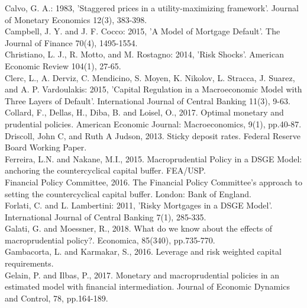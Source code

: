 \documentclass[12pt]{article}
\numberwithin{equation}{section}
\begin{document}
Calvo, G. A.: 1983, 'Staggered prices in a utility-maximizing framework'. Journal of Monetary Economics 12(3), 383-398.\\

Campbell, J. Y. and J. F. Cocco: 2015, 'A Model of Mortgage Default'. The Journal of Finance 70(4), 1495-1554.\\

Christiano, L. J., R. Motto, and M. Rostagno: 2014, 'Risk Shocks'. American Economic Review 104(1), 27-65.\\

Clerc, L., A. Derviz, C. Mendicino, S. Moyen, K. Nikolov, L. Stracca, J. Suarez, and A. P. Vardoulakis: 2015, 'Capital Regulation in a Macroeconomic Model with Three Layers of Default'. International Journal of Central Banking 11(3), 9-63.\\

Collard, F., Dellas, H., Diba, B. and Loisel, O., 2017. Optimal monetary and prudential policies. American Economic Journal: Macroeconomics, 9(1), pp.40-87. \\

Driscoll, John C, and Ruth A Judson, 2013. Sticky deposit rates. Federal Reserve Board
Working Paper.\\

Ferreira, L.N. and Nakane, M.I., 2015. Macroprudential Policy in a DSGE Model: anchoring the countercyclical capital buffer. FEA/USP. \\

Financial Policy Committee, 2016. The Financial Policy Committee’s approach to setting the countercyclical capital buffer. London: Bank of England. \\

Forlati, C. and L. Lambertini: 2011, 'Risky Mortgages in a DSGE Model'. International Journal of Central Banking 7(1), 285-335.\\

Galati, G. and Moessner, R., 2018. What do we know about the effects of macroprudential policy?. Economica, 85(340), pp.735-770.\\

Gambacorta, L. and Karmakar, S., 2016. Leverage and risk weighted capital requirements.\\

Gelain, P. and Ilbas, P., 2017. Monetary and macroprudential policies in an estimated model with financial intermediation. Journal of Economic Dynamics and Control, 78, pp.164-189.\\
\end{document}
